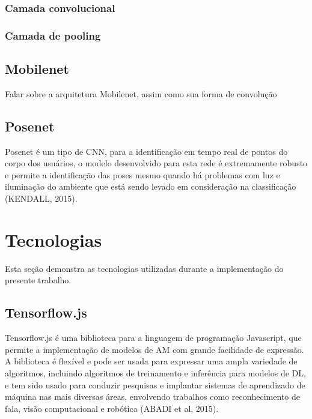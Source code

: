 \subsubsection{Camada convolucional}

\subsubsection{Camada de pooling}


\subsection{Mobilenet}

Falar sobre a arquitetura Mobilenet, assim como sua forma de convolução

\subsection{Posenet}

Posenet é um tipo de CNN, para a identificação em tempo real de pontos do corpo dos usuários, o modelo desenvolvido para esta rede é extremamente robusto e permite a identificação das poses mesmo quando há problemas com luz e iluminação do ambiente que está sendo levado em consideração na classificação (KENDALL, 2015). 

\section{Tecnologias}

Esta seção demonstra as tecnologias utilizadas durante a implementação do presente trabalho.

\subsection{Tensorflow.js}

Tensorflow.js é uma biblioteca para a linguagem de programação Javascript, que permite a implementação de modelos de AM com grande facilidade de expressão. A biblioteca é flexível e pode ser usada para expressar uma ampla variedade de algoritmos, incluindo algoritmos de treinamento e inferência para modelos de DL, e tem sido usado para conduzir pesquisas e implantar sistemas de aprendizado de máquina nas mais diversas áreas, envolvendo trabalhos como reconhecimento de fala, visão computacional e robótica (ABADI et al, 2015). 


